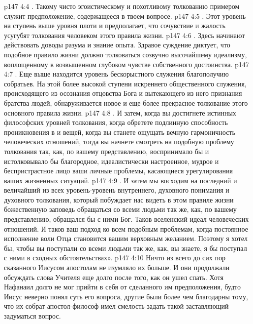 \vs p147 4:4 .  Такому чисто эгоистическому и похотливому толкованию примером служит предположение, содержащееся в твоем вопросе.
\vs p147 4:5 \pc .  Этот уровень на ступень выше уровня плоти и предполагает, что сочувствие и жалость усугубят толкования человеком этого правила жизни.
\vs p147 4:6 \pc .  Здесь начинают действовать доводы разума и знание опыта. Здравое суждение диктует, что подобное правило жизни должно толковаться созвучно высочайшему идеализму, воплощенному в возвышенном глубоком чувстве собственного достоинства.
\vs p147 4:7 \pc .  Еще выше находится уровень бескорыстного служения благополучию собратьев. На этой более высокой ступени искреннего общественного служения, происходящего из осознания отцовства Бога и вытекающего из него признания братства людей, обнаруживается новое и еще более прекрасное толкование этого основного правила жизни.
\vs p147 4:8 \pc .  И затем, когда вы достигнете истинных философских уровней толкования, когда обретете подлинную способность проникновения в  и  вещей, когда вы станете ощущать вечную гармоничность человеческих отношений, тогда вы начнете смотреть на подобную проблему толкования так, как, по вашему представлению, воспринимало бы и истолковывало бы благородное, идеалистически настроенное, мудрое и беспристрастное лицо ваши личные проблемы, касающиеся урегулирования ваших жизненных ситуаций.
\vs p147 4:9 \pc .  И затем мы восходим на последний и величайший из всех уровень\hyp{}уровень внутреннего, духовного понимания и духовного толкования, который побуждает нас видеть в этом правиле жизни божественную заповедь обращаться со всеми людьми так же, как, по вашему представлению, обращался бы с ними Бог. Таков вселенский идеал человеческих отношений. И таков ваш подход ко всем подобным проблемам, когда постоянное исполнение воли Отца становится вашим верховным желанием. Поэтому я хотел бы, чтобы вы поступали со всеми людьми так же, как, вы знаете, я бы поступал с ними в сходных обстоятельствах».
\vs p147 4:10 \pc Ничто из всего до сих пор сказанного Иисусом апостолам не изумляло их больше. И они продолжали обсуждать слова Учителя еще долго после того, как он ушел спать. Хотя Нафанаил долго не мог прийти в себя от сделанного им предположения, будто Иисус неверно понял суть его вопроса, другие были более чем благодарны тому, что их собрат апостол\hyp{}философ имел смелость задать такой заставляющий задуматься вопрос.
